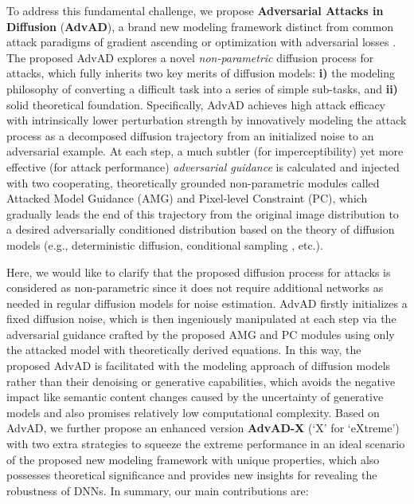 \documentclass{article}
\begin{document}
To address this fundamental challenge, we propose \textbf{Adversarial Attacks in Diffusion} (\textbf{AdvAD}), a brand new modeling framework distinct from common attack paradigms of gradient ascending \cite{goodfellow2014explaining} or optimization with adversarial losses \cite{carlini2017towards}. The proposed AdvAD explores a novel \textit{non-parametric} diffusion process for attacks, which fully inherits two key merits of diffusion models: \textbf{i)} the modeling philosophy of converting a difficult task into a series of simple sub-tasks, and \textbf{ii)} solid theoretical foundation. Specifically, AdvAD achieves high attack efficacy with intrinsically lower perturbation strength by innovatively modeling the attack process as a decomposed diffusion trajectory from an initialized noise to an adversarial example. At each step, a much subtler {(for imperceptibility)} yet more effective {(for attack performance) \textit{adversarial guidance}} is calculated and injected with two cooperating, theoretically grounded {non-parametric modules} called Attacked Model Guidance (AMG) and Pixel-level Constraint (PC), which gradually leads the end of this trajectory from the original image distribution to a desired adversarially conditioned distribution based on the theory of diffusion models (e.g., deterministic diffusion\cite{song2020denoising}, conditional sampling \cite{dhariwal2021diffusion, song2020score}, etc.).


{Here, we would like to clarify that the proposed diffusion process for attacks is considered as non-parametric since it does not require additional networks as needed in regular diffusion models for noise estimation. AdvAD firstly initializes a fixed diffusion noise, which is then ingeniously manipulated at each step via the adversarial guidance crafted by the proposed AMG and PC modules using only the attacked model with theoretically derived equations. In this way, the proposed AdvAD is facilitated with the modeling approach of diffusion models rather than their denoising or generative capabilities, which avoids the negative impact like semantic content changes caused by the uncertainty of generative models and also promises relatively low computational complexity.}
Based on AdvAD, we further propose an enhanced version \textbf{AdvAD-X} (`X' for `eXtreme') with two extra strategies to squeeze the extreme performance in an ideal scenario of the proposed new modeling framework with unique properties, which also possesses theoretical significance and provides new insights for revealing the robustness of DNNs. In summary, our main contributions are:
\end{document}
